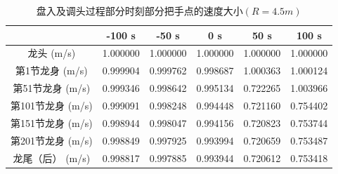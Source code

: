 \documentclass[withoutpreface,bwprint]{cumcmthesis} %
\begin{document}
\begin{table}[!htbp]
    \centering
    \caption{盘入及调头过程部分时刻部分把手点的速度大小$(R=4.5m)$}
    \label{table4}
    \begin{tabular}{cccccc}
        \toprule[2pt]
        ~ &-100 s & -50 s & 0 s & 50 s & 100 s \\ 
        \midrule[1pt]
        龙头 (m/s) & 1.000000  & 1.000000  & 1.000000  & 1.000000  & 1.000000  \\ 
        第1节龙身  (m/s) & 0.999904  & 0.999762  & 0.998687  & 1.000363  & 1.000124  \\
        第51节龙身  (m/s) & 0.999346  & 0.998642  & 0.995134  & 0.722265  & 1.003966  \\ 
        第101节龙身  (m/s) & 0.999091  & 0.998248  & 0.994448  & 0.721160  & 0.754402  \\
        第151节龙身  (m/s) & 0.998944  & 0.998047  & 0.994156  & 0.720823  & 0.753744  \\ 
        第201节龙身  (m/s) & 0.998849  & 0.997925  & 0.993994  & 0.720659  & 0.753487  \\
        龙尾（后） (m/s) & 0.998817  & 0.997885  & 0.993944  & 0.720612  & 0.753418 \\ 
        \bottomrule[2pt]
    \end{tabular}
\end{table}
\end{document}
